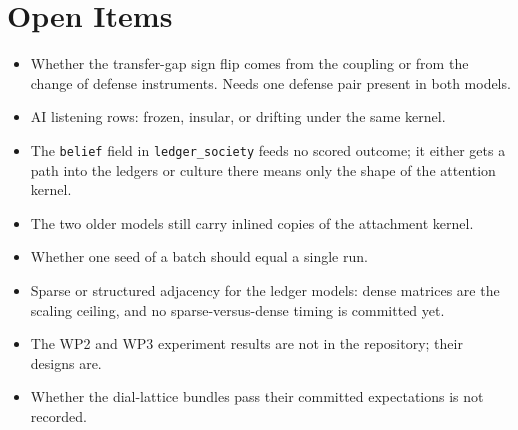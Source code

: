 \documentclass[11pt]{article}
\newcommand{\code}[1]{\texttt{#1}}
\begin{document}
\section{Open Items}

\begin{itemize}
\item Whether the transfer-gap sign flip comes from the coupling or from the change of
  defense instruments. Needs one defense pair present in both models.
\item AI listening rows: frozen, insular, or drifting under the same kernel.
\item The \code{belief} field in \code{ledger\_society} feeds no scored outcome; it
  either gets a path into the ledgers or culture there means only the shape of the
  attention kernel.
\item The two older models still carry inlined copies of the attachment kernel.
\item Whether one seed of a batch should equal a single run.
\item Sparse or structured adjacency for the ledger models: dense matrices are the
  scaling ceiling, and no sparse-versus-dense timing is committed yet.
\item The WP2 and WP3 experiment results are not in the repository; their designs are.
\item Whether the dial-lattice bundles pass their committed expectations is not
  recorded.
\end{itemize}
\end{document}
